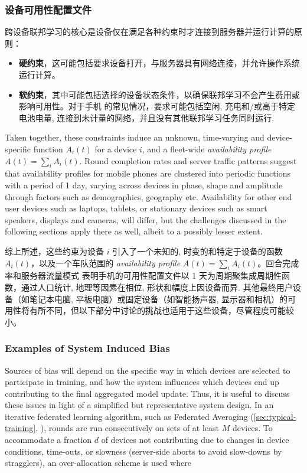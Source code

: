 \subsubsection*{设备可用性配置文件}
跨设备联邦学习的核心是设备仅在满足各种约束时才连接到服务器并运行计算的原则：
\begin{itemize}
    \item \textbf{硬约束}，这可能包括要求设备打开，与服务器具有网络连接，并允许操作系统运行计算。
    \item \textbf{软约束}，其中可能包括选择的设备状态条件，以确保联邦学习不会产生费用或影响可用性。对于手机 \citep{bonawitz19sysml,apple19wwdc} 的常见情况，要求可能包括空闲, 充电和/或高于特定电池电量, 连接到未计量的网络，并且没有其他联邦学习任务同时运行.
\end{itemize}
Taken together, these constraints induce an unknown, time-varying and device-specific function $A_i(t)$ for a device $i$, and a fleet-wide \textit{availability profile} $A(t)=\sum_i A_i (t)$. Round completion rates and server traffic patterns \citep{bonawitz19sysml, yang18gboardquery} suggest that availability profiles for mobile phones are clustered into periodic functions with a period of 1 day, varying across devices in phase, shape and amplitude through factors such as demographics, geography etc. Availability for other end user devices such as laptops, tablets, or stationary devices such as smart speakers, displays and cameras, will differ, but the challenges discussed in the following sections apply there as well, albeit to a possibly lesser extent.

综上所述，这些约束为设备 $i$ 引入了一个未知的, 时变的和特定于设备的函数 $A_i(t)$，以及一个车队范围的 \textit{availability profile} $A(t)=\sum_i A_i (t)$。回合完成率和服务器流量模式 \citep{bonawitz19sysml, yang18gboardquery} 表明手机的可用性配置文件以 1 天为周期聚集成周期性函数，通过人口统计, 地理等因素在相位, 形状和幅度上因设备而异. 其他最终用户设备（如笔记本电脑, 平板电脑）或固定设备（如智能扬声器, 显示器和相机）的可用性将有所不同，但以下部分中讨论的挑战也适用于这些设备，尽管程度可能较小。

\subsubsection{Examples of System Induced Bias}
Sources of bias will depend on the specific way in which devices are selected to participate in training, and how the system influences which devices end up contributing to the final aggregated model update. Thus, it is useful to discuss these issues in light of a simplified but representative system design. In an iterative federated learning algorithm, such as Federated Averaging (\cref{sec:typical-training}, \citep{mcmahan17fedavg}), rounds are run consecutively on sets of at least $M$ devices. To accommodate a fraction $d$ of devices not contributing due to changes in device conditions, time-outs, or slowness (server-side aborts to avoid slow-downs by stragglers), an over-allocation scheme is used where

